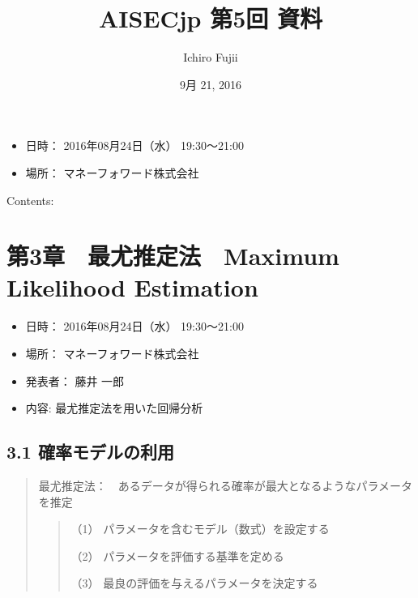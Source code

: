 \documentclass[letterpaper,10pt,dvipdfmx]{sphinxmanual}
\title{AISECjp 第5回 資料}
\date{9月 21, 2016}
\author{Ichiro Fujii}
\begin{document}
\maketitle
\tableofcontents
{}\label{index::doc}

\begin{itemize}
\item {} 
日時： 2016年08月24日（水） 19:30～21:00

\item {} 
場所： マネーフォワード株式会社

\end{itemize}

Contents:


\chapter{第3章　最尤推定法　Maximum Likelihood Estimation}
\label{Chapter_3_MLE::doc}\label{Chapter_3_MLE:maximum-likelihood-estimation}\label{Chapter_3_MLE:aisecjp-5-documentation}\begin{itemize}
\item {} 
日時： 2016年08月24日（水） 19:30～21:00

\item {} 
場所： マネーフォワード株式会社

\item {} 
発表者： 藤井 一郎

\item {} 
内容: 最尤推定法を用いた回帰分析

\end{itemize}


\section{3.1 確率モデルの利用}
\label{Chapter_3_MLE:id1}\begin{quote}

最尤推定法：　あるデータが得られる確率が最大となるようなパラメータを推定
\begin{quote}

（1） パラメータを含むモデル（数式）を設定する

（2） パラメータを評価する基準を定める

（3） 最良の評価を与えるパラメータを決定する
\end{quote}
\end{quote}
\end{document}
